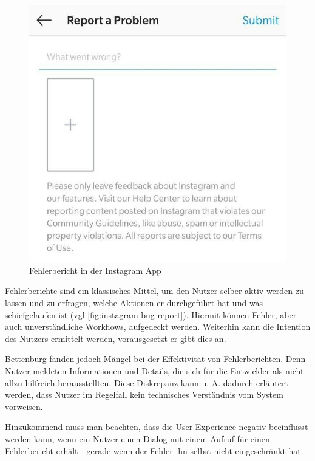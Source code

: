 \begin{figure}
\centering
\vspace{-\baselineskip}
\includegraphics[width=\linewidth]{img/instagram-feedback/instagram-feedback.jpg}
\caption{Fehlerbericht in der Instagram App \cite{Instagram}}
\label{fig:instagram-bug-report}
\end{figure}

Fehlerberichte sind ein klassisches Mittel, um den Nutzer selber aktiv werden zu lassen und zu erfragen, welche Aktionen er durchgeführt hat und was schiefgelaufen ist (vgl \autoref{fig:instagram-bug-report}). Hiermit können Fehler, aber auch unverständliche Workflows, aufgedeckt werden. Weiterhin kann die Intention des Nutzers ermittelt werden, vorausgesetzt er gibt dies an.

Bettenburg \etal \cite{WhatMakesAGoodBugReport} fanden jedoch Mängel bei der Effektivität von Fehlerberichten. Denn Nutzer meldeten Informationen und Details, die sich für die Entwickler als nicht allzu hilfreich herausstellten. Diese Diskrepanz kann u. A. dadurch erläutert werden, dass Nutzer im Regelfall kein technisches Verständnis vom System vorweisen.

Hinzukommend muss man beachten, dass die User Experience negativ beeinflusst werden kann, wenn ein Nutzer einen Dialog mit einem Aufruf für einen Fehlerbericht erhält - gerade wenn der Fehler ihn selbst nicht eingeschränkt hat.


